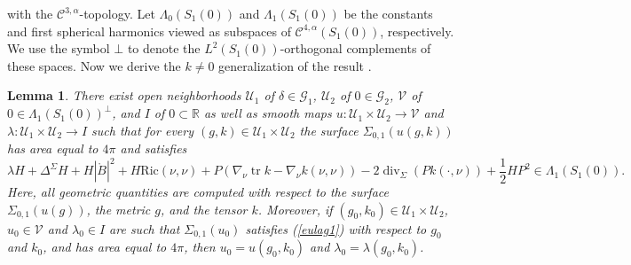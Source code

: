 \documentclass[12pt,a4paper]{amsart}
\theoremstyle{plain}
\newtheorem{lemma}[theorem]{Lemma}
\theoremstyle{definition}
\newcommand{\diver}{\operatorname{div}}
\newcommand{\tr}{\operatorname{tr}}
\begin{document}
with the $\mathcal{C}^{3,\alpha}$-topology. Let $\Lambda_0(S_1(0))$ and $\Lambda_1(S_1(0))$ be the constants and first spherical harmonics
viewed as subspaces of $\mathcal{C}^{4,\alpha}(S_1(0))$, respectively. We use the symbol $\bot$ to denote the $L^2(S_1(0))$-orthogonal complements of these spaces. Now we derive the $k\neq 0$ generalization of the result \cite[Lemma 16]{eichko}.
\begin{lemma}
There exist open neighborhoods $\mathcal{U}_1$ of $\delta \in  \mathcal{G}_1$, $\mathcal{U}_2$ of $0 \in  \mathcal{G}_2$,  $\mathcal{V}$ of $0 \in \Lambda_1(S_1(0))^\bot$, and $I$ of $0 \subset \mathbb{R}$ as
well as smooth maps $u : \mathcal{U}_1 \times \mathcal{U}_2 \longrightarrow \mathcal{V}$ and $\lambda : \mathcal{U}_1 \times \mathcal{U}_2 \longrightarrow I$ such that for every $(g,k)\in\mathcal U_1\times\mathcal U_2$ the surface $\Sigma_{0,1}(u(g,k))$ has area equal to $4 \pi$ and satisfies
\begin{equation}\label{eulag1}
 \lambda H  +\Delta^\Sigma H + H|\mathring{B}|^2+ H \mathrm{Ric}(\nu, \nu)+P( \nabla_\nu \tr k - \nabla_\nu k(\nu,\nu )) - 2\diver_\Sigma (Pk(\cdot, \nu)) +\frac{1}{2}H P^2 \in \Lambda_1(S_1(0)).
\end{equation}  
Here, all geometric quantities are computed with respect to the surface $\Sigma_{0,1}(u(g))$, the metric $g$, and the tensor $k$. Moreover, if $(g_0,k_0) \in \mathcal{U}_1 \times \mathcal{U}_2 $,  $u_0 \in \mathcal{V} $ and $\lambda_0 \in I$ are such that $\Sigma_{0,1}(u_0)$ satisfies (\ref{eulag1}) with respect to $g_0$ and $k_0$, and has area equal to $4 \pi$, then $u_0 = u(g_0, k_0)$ and $\lambda_0 = \lambda (g_0, k_0)$.
\end{lemma}
\end{document}
